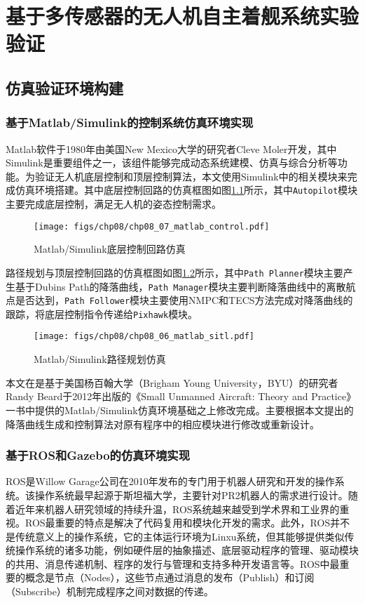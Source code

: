 \chapter{基于多传感器的无人机自主着舰系统实验验证}

\section{仿真验证环境构建}
\subsection{基于Matlab/Simulink的控制系统仿真环境实现}
Matlab软件于1980年由美国New Mexico大学的研究者Cleve Moler开发，其中Simulink是重要组件之一，该组件能够完成动态系统建模、仿真与综合分析等功能。为验证无人机底层控制和顶层控制算法，本文使用Simulink中的相关模块来完成仿真环境搭建。其中底层控制回路的仿真框图如图\ref{fig:chp08_07_matlab_control}所示，其中\texttt{Autopilot}模块主要完成底层控制，满足无人机的姿态控制需求。

\begin{figure}[!ht]
	\centering
	\texttt{[image: figs/chp08/chp08\_07\_matlab\_control.pdf]}	
	\caption{Matlab/Simulink底层控制回路仿真}
	\label{fig:chp08_07_matlab_control}
\end{figure}

路径规划与顶层控制回路的仿真框图如图\ref{fig:chp08_06_matlab_sitl}所示，其中\texttt{Path Planner}模块主要产生基于Dubins Path的降落曲线，\texttt{Path Manager}模块主要判断降落曲线中的离散航点是否达到，\texttt{Path Follower}模块主要使用NMPC和TECS方法完成对降落曲线的跟踪，将底层控制指令传递给\texttt{Pixhawk}模块。

\begin{figure}[!ht]
	\centering
	\texttt{[image: figs/chp08/chp08\_06\_matlab\_sitl.pdf]}	
	\caption{Matlab/Simulink路径规划仿真}
	\label{fig:chp08_06_matlab_sitl}
\end{figure}

本文在是基于美国杨百翰大学（Brigham Young University，BYU）的研究者Randy Beard于2012年出版的《Small Unmanned Aircraft: Theory and Practice》一书\cite{beard2012small}中提供的Matlab/Simulink仿真环境基础之上修改完成。主要根据本文提出的降落曲线生成和控制算法对原有程序中的相应模块进行修改或重新设计。

\subsection{基于ROS和Gazebo的仿真环境实现}
ROS是Willow Garage公司在2010年发布的专门用于机器人研究和开发的操作系统。该操作系统最早起源于斯坦福大学，主要针对PR2机器人的需求进行设计。随着近年来机器人研究领域的持续升温，ROS系统越来越受到学术界和工业界的重视。ROS最重要的特点是解决了代码复用和模块化开发的需求。此外，ROS并不是传统意义上的操作系统，它的主体运行环境为Linxu系统，但其能够提供类似传统操作系统的诸多功能，例如硬件层的抽象描述、底层驱动程序的管理、驱动模块的共用、消息传递机制、程序的发行与管理和支持多种开发语言等。ROS中最重要的概念是节点（Nodes），这些节点通过消息的发布（Publish）和订阅（Subscribe）机制完成程序之间对数据的传递。

